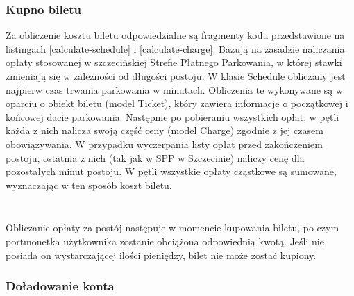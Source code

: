 \subsubsection*{Kupno biletu}

Za obliczenie kosztu biletu odpowiedzialne są fragmenty kodu przedstawione na listingach \ref{calculate-schedule} i \ref{calculate-charge}. Bazują na zasadzie naliczania opłaty stosowanej w szczecińskiej Strefie Płatnego Parkowania, w której stawki zmieniają się w zależności od długości postoju. W klasie Schedule obliczany jest najpierw czas trwania parkowania w minutach. Obliczenia te wykonywane są w oparciu o obiekt biletu (model Ticket), który zawiera informacje o początkowej i końcowej dacie parkowania. Następnie po pobieraniu wszystkich opłat, w pętli każda z nich nalicza swoją część ceny (model Charge) zgodnie z jej czasem obowiązywania. W przypadku wyczerpania listy opłat przed zakończeniem postoju, ostatnia z nich (tak jak w SPP w Szczecinie) naliczy cenę dla pozostałych minut postoju. W pętli wszystkie opłaty cząstkowe są sumowane, wyznaczając w ten sposób koszt biletu.

\begin{singlespace}
	\label{calculate-schedule}
	\vspace{0.3cm}
	\inputminted[fontsize=\footnotesize]{python}{src/imp/schedule-calculate_price.py}
\end{singlespace}

\begin{singlespace}
	\label{calculate-charge}
	\vspace{0.3cm}
	\inputminted[fontsize=\footnotesize]{python}{src/imp/charge-calculate_price.py}
\end{singlespace}

\vspace{0.3cm}

Obliczanie opłaty za postój następuje w momencie kupowania biletu, po czym portmonetka użytkownika zostanie obciążona odpowiednią kwotą. Jeśli nie posiada on wystarczającej ilości pieniędzy, bilet nie może zostać kupiony.

\subsubsection*{Doładowanie konta}

